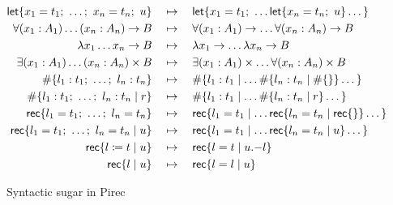 \begin{figure}
  \begin{align*}
    \operatorname{\mathsf{let}} \{ x_1 = t_1;\ \dots;\ x_n = t_n;\ u \}
     & \quad\mapsto\quad
    \operatorname{\mathsf{let}} \{ x_1 = t_1;\ \dots \operatorname{\mathsf{let}} \{ x_n = t_n;\ u \} \dots \}
    \\
    \forall (x_1 : A_1) \dots (x_n : A_n) \to B
     & \quad\mapsto\quad
    \forall (x_1 : A_1) \to \dots \forall (x_n : A_n) \to B
    \\
    \lambda x_1 \dots x_n \to B
     & \quad\mapsto\quad
    \lambda x_1 \to \dots \lambda x_n \to B
    \\
    \exists (x_1 : A_1) \dots (x_n : A_n) \times B
     & \quad\mapsto\quad
    \exists (x_1 : A_1) \times \dots \forall (x_n : A_n) \times B
    \\
    \# \{ l_1 : t_1;\ \dots;\ l_n : t_n \}
     & \quad\mapsto\quad
    \# \{ l_1 : t_1 \mid \dots \# \{ l_n : t_n \mid \# \{ \} \} \dots \}
    \\
    \# \{ l_1 : t_1;\ \dots;\ l_n : t_n \mid r \}
     & \quad\mapsto\quad
    \# \{ l_1 : t_1 \mid \dots \# \{ l_n : t_n \mid r \} \dots \}
    \\
    \operatorname{\mathsf{rec}} \{ l_1 = t_1;\ \dots;\ l_n = t_n \}
     & \quad\mapsto\quad
    \operatorname{\mathsf{rec}} \{ l_1 = t_1 \mid \dots
    \operatorname{\mathsf{rec}} \{ l_n = t_n \mid \operatorname{\mathsf{rec}} \{ \} \} \dots \}
    \\
    \operatorname{\mathsf{rec}} \{ l_1 = t_1;\ \dots;\ l_n = t_n \mid u \}
     & \quad\mapsto\quad
    \operatorname{\mathsf{rec}} \{ l_1 = t_1 \mid \dots
    \operatorname{\mathsf{rec}} \{ l_n = t_n \mid u \} \dots \}
    \\
    \operatorname{\mathsf{rec}} \{ l \coloneqq t \mid u \}
     & \quad\mapsto\quad
    \operatorname{\mathsf{rec}} \{ l = t \mid u \mathord{.-} l \}
    \\
    \operatorname{\mathsf{rec}} \{ l \mid u \}
     & \quad\mapsto\quad
    \operatorname{\mathsf{rec}} \{ l = l \mid u \}
  \end{align*}
  \caption{Syntactic sugar in Pirec}\label{fig:sugar}
\end{figure}

